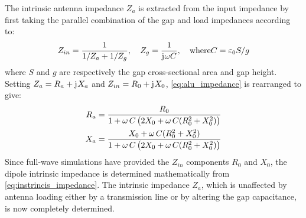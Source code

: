\documentclass[11pt]{article}
\begin{document}
The intrinsic antenna impedance $Z_a$ is extracted from the input impedance by first taking the parallel combination of the gap and load impedances according to:
%
\begin{equation}
  Z_{in} = \frac{1}{1 / Z_a + 1 / Z_g}, \quad  Z_g = \frac{1}{\mathrm{j}\mkern1mu \omega C}, \quad \text{where} C = \varepsilon_0 S/g
  \label{eq:alu_impedance}
\end{equation}
%
where $S$ and $g$ are respectively the gap cross-sectional area and gap height. Setting $Z_a = R_a + \mathrm{j}\mkern1mu X_a$ and $Z_{in} = R_0 + \mathrm{j}\mkern1mu X_0$,  \eqref{eq:alu_impedance} is rearranged to give:
%
\begin{subequations}
  \begin{align}
    R_a ={}& \frac{R_0}{1 + \omega \, C \left( 2 X_0 + \omega \,C (R_0^2 + X_0^2) \right)}
    \label{eq:intrinsic_resistance}\\
    X_a ={}& \frac{X_0 + \omega \, C (R_0^2 + X_0^2)} {1 + \omega \, C\left( 2 X_0 + \omega \, C (R_0^2 + X_0^2) \right)}
    \label{eq:intrinsic_admittance}
  \end{align}
  \label{eq:instrincis_impedance}
\end{subequations}
%
Since full-wave simulations have provided the $Z_{in}$ components $R_0$ and $X_0$, the dipole intrinsic impedance is determined mathematically from \eqref{eq:instrincis_impedance}. The intrinsic impedance $Z_a$, which is unaffected by antenna loading either by a transmission line or by altering the gap capacitance, is now completely determined.
\end{document}
